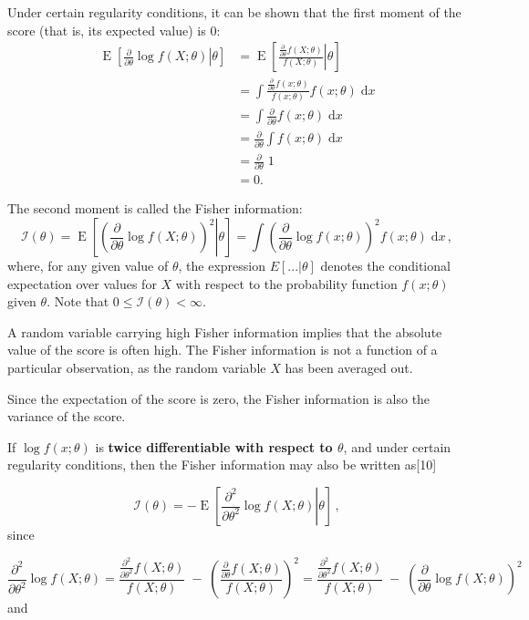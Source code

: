 \documentclass{article}
\begin{document}
Under certain regularity conditions, it can be shown that the first moment of the score (that is, its expected value) is $0$:
$$
\begin{aligned}
\operatorname{E} \left[\left. \frac{\partial}{\partial\theta} \log f(X;\theta)\right|\theta \right]
& = \operatorname{E} \left[\left. \frac{\frac{\partial}{\partial\theta} f(X;\theta)}{f(X; \theta)}\right|\theta \right]\\
& = \int \frac{\frac{\partial}{\partial\theta} f(x;\theta)}{f(x; \theta)} f(x;\theta)\; \mathrm{d}x\\
& = \int \frac{\partial}{\partial\theta} f(x;\theta)\; \mathrm{d}x\\
& = \frac{\partial}{\partial\theta} \int f(x; \theta)\; \mathrm{d}x\\
& = \frac{\partial}{\partial\theta} \; 1 \\
& = 0.
\end{aligned}
$$

The second moment is called the Fisher information:
$$
\mathcal{I}(\theta)=\operatorname{E} \left[\left. \left(\frac{\partial}{\partial\theta} \log f(X;\theta)\right)^2\right|\theta \right] = \int \left(\frac{\partial}{\partial\theta} \log f(x;\theta)\right)^2 f(x; \theta)\; \mathrm{d}x\,,
$$
where, for any given value of $\theta$, the expression $E[...|\theta]$ denotes the conditional expectation over values for $X$ with respect to the probability function $f(x; \theta)$ given $\theta$. Note that $0 \leq \mathcal{I}(\theta) < \infty$.

A random variable carrying high Fisher information implies that the absolute value of the score is often high.
The Fisher information is not a function of a particular observation, as the random variable $X$ has been averaged out.

Since the expectation of the score is zero, the Fisher information is also the variance of the score.

If $\log f(x; \theta)$ is \textbf{twice differentiable with respect to $\theta$}, and under certain regularity conditions,
then the Fisher information may also be written as[10]

$$ \mathcal{I}(\theta) = - \operatorname{E} \left[\left. \frac{\partial^2}{\partial\theta^2} \log f(X;\theta)\right|\theta \right]\,, $$
since

$$
\frac{\partial^2}{\partial\theta^2} \log f(X;\theta)
= \frac{\frac{\partial^2}{\partial\theta^2} f(X;\theta)}{f(X; \theta)}
\;-\;
\left( \frac{\frac{\partial}{\partial\theta} f(X;\theta)}{f(X; \theta)} \right)^2
= \frac{\frac{\partial^2}{\partial\theta^2} f(X;\theta)}{f(X; \theta)}
\;-\;
\left( \frac{\partial}{\partial\theta} \log f(X;\theta)\right)^2
$$
and
\end{document}

